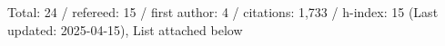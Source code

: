 Total: 24 / refereed: 15 / first author: 4 / citations: 1,733 / h-index: 15 (Last updated: 2025-04-15), List attached below